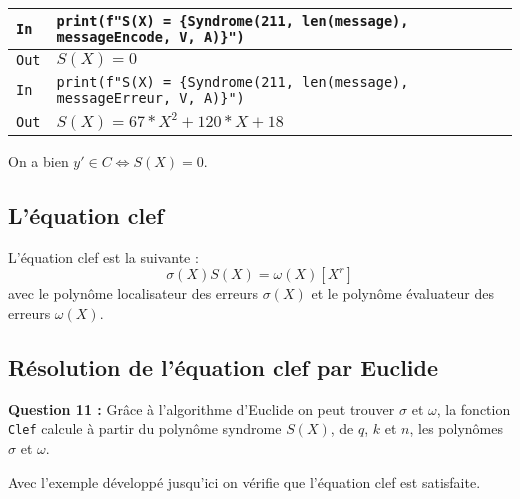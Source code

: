 \documentclass[titlepage]{article}
\begin{document}
        \begin{tabularx}{12cm}{|p{0.60cm}|X|}
            \hline
            \rowcolor{gray}
            \texttt{In}
            & 
            \texttt{print(f"S(X) = \{Syndrome(211, len(message), \newline
            messageEncode, V, A)\}")}
            \\
            \hline
            \texttt{Out}
            &
            \texttt{$S(X) = 0$}
            \\
            \hline
            \rowcolor{gray}
            \texttt{In}
            & 
            \texttt{print(f"S(X) = \{Syndrome(211, len(message), \newline
            messageErreur, V, A)\}")}
            \\
            \hline
            \texttt{Out}
            &
            \texttt{$S(X) = 67*X^2 + 120*X + 18$}
            \\
            \hline
        \end{tabularx}
        \bigbreak

        On a bien $y' \in C \Longleftrightarrow S(X) = 0$.

        \subsection{L’équation clef}
        L'équation clef est la suivante : 
        \[\sigma(X)S(X) = \omega(X) [X^r]\]
        avec le polynôme localisateur des erreurs $\sigma(X)$ et le polynôme évaluateur des erreurs $\omega(X)$.

        \subsection{Résolution de l’équation clef par Euclide}
        
        \textbf{Question 11 :}
        Grâce à l'algorithme d'Euclide on peut trouver $\sigma$ et $\omega$, la fonction \texttt{Clef} 
        calcule à partir du polynôme syndrome $S(X)$, de $q$, $k$ et $n$, les polynômes $\sigma$ et $\omega$.

        
        
        Avec l'exemple développé jusqu'ici on vérifie que l'équation clef est satisfaite.
\end{document}
